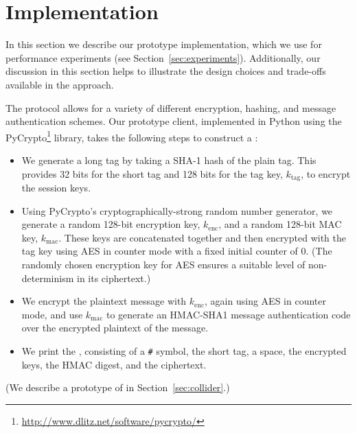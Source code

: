 \section{Implementation}
\label{sec:implementation}

In this section we describe our prototype \hoot implementation, which we
use for performance experiments (see
Section~\ref{sec:experiments}). Additionally, our discussion in this
section helps to illustrate the design choices and trade-offs available
in the \hoot approach.

The \hoot protocol allows for a variety of different encryption,
hashing, and message authentication schemes. Our prototype client,
implemented in Python using the
PyCrypto\footnote{\url{http://www.dlitz.net/software/pycrypto/}}
library, takes the following steps to construct a \msg:
\begin{itemize}
\item We generate a long tag by taking a SHA-1 hash of the plain
  tag. This provides 32 bits for the short tag and 128 bits for the
 tag key, $k_{\mathrm{tag}}$, to encrypt the session keys.
\item Using PyCrypto's cryptographically-strong random number
  generator, we generate 
  a random 128-bit encryption key, $k_{\mathrm{enc}}$, and a random 128-bit MAC key,
  $k_{\mathrm{mac}}$. These keys are
  concatenated together and then encrypted with the tag key using AES in
  counter mode with a fixed initial counter of $0$. (The randomly
  chosen encryption key for AES ensures a suitable level of
  non-determinism in its ciphertext.)
\item We encrypt the plaintext message with $k_{\mathrm{enc}}$, again using AES in
  counter mode, and use $k_{\mathrm{mac}}$ to generate an HMAC-SHA1
  message authentication code over the encrypted plaintext of the
  message.
\item We print the \msg, consisting of a {\tt \#} symbol, the short tag,
  a space, the encrypted keys, the HMAC digest, and the ciphertext.
\end{itemize}

(We describe a prototype of  in
Section~\ref{sec:collider}.)

